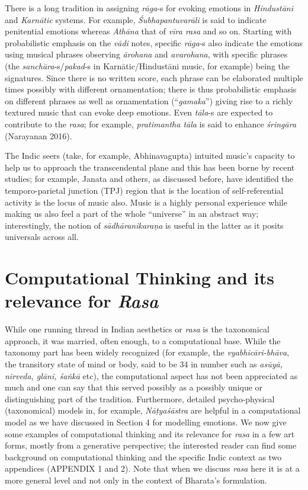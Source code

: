 There is a long tradition in assigning \textsl{rāga}-s for evoking emotions in \textsl{Hindustāni} and \textsl{Karnātic} systems. For example, \textsl{Śubhapantuvarāli} is said to indicate penitential emotions whereas \textsl{Athāna} that of \textsl{vīra rasa} and so on. Starting with probabilistic emphasis on the \textsl{vādi} notes, specific \textsl{rāga}-s also indicate the emotions using musical phrases observing \textsl{ārohana} and \textsl{avarohana}, with specific phrases (the \textsl{sanchāra}-s/\textsl{pakad}-s in Karnātic/Hindustāni music, for example) being the signatures. Since there is no written score, each phrase can be elaborated multiple times possibly with different ornamentation; there is thus probabilistic emphasis on different phrases as well as ornamentation (“\textsl{gamaka}”) giving rise to a richly textured music that can evoke deep emotions. Even \textsl{tāla}-s are expected to contribute to the \textsl{rasa}; for example, \textsl{pratimantha tāla} is said to enhance \textsl{śringāra} (Narayanan 2016). 

The Indic seers (take, for example, Abhinavagupta) intuited music’s capacity to help us to approach the transcendental plane and this has been borne by recent studies; for example, Janata and others, as discussed before, have identified the temporo-parietal junction (TPJ) region that is the location of self-referential activity is the locus of music also. Music is a highly personal experience while making us also feel a part of the whole “universe” in an abstract way; interestingly, the notion of \textsl{sādhāranikaraṇa} is useful in the latter as it posits universals across all.

\section{Computational Thinking and its relevance for \textsl{Rasa}}\label{chap3-sec5}

While one running thread in Indian aesthetics or \textsl{rasa} is the taxonomical approach, it was married, often enough, to a computational base. While the taxonomy part has been widely recognized (for example, the \textsl{vyabhicāri-bhāva}, the transitory state of mind or body, said to be 34 in number such as \textsl{asūyā, nirveda, glāni, śaṅkā} etc), the computational aspect has not been appreciated as much and one can say that this served possibly as a possibly unique or distinguishing part of the tradition. Furthermore, detailed psycho-physical (taxonomical) models in, for example, \textsl{Nāṭyaśāstra} are helpful in a computational model as we have discussed in Section 4 for modelling emotions. We now give some examples of computational thinking and its relevance for \textsl{rasa} in a few art forms, mostly from a generative perspective; the interested reader can find some background on computational thinking and the specific Indic context as two appendices (APPENDIX 1 and 2). Note that when we discuss \textsl{rasa} here it is at a more general level and not only in the context of Bharata’s formulation.\\[-20pt]

